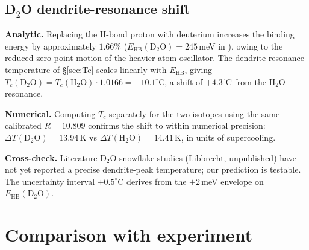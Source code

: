 \documentclass[final]{siamltex}
\newcommand{\EHB}{E_{\mathrm{HB}}}
\begin{document}
\subsection{D$_2$O dendrite-resonance shift}
\label{sec:d2o}

\textbf{Analytic.}  Replacing the H-bond proton with deuterium
increases the binding energy by approximately $1.66\%$
($\EHB(\mathrm{D}_2\mathrm{O}) = 245$\,meV in
\cite{MamounPaperIV}), owing to the reduced zero-point motion of
the heavier-atom oscillator.  The dendrite resonance temperature
of \S\ref{sec:Tc} scales linearly with $\EHB$, giving
$T_c(\mathrm{D}_2\mathrm{O}) = T_c(\mathrm{H}_2\mathrm{O}) \cdot
1.0166 = -10.1^{\circ}$C, a shift of $+4.3^{\circ}$C from the
H$_2$O resonance.

\textbf{Numerical.}  Computing $T_c$ separately for the two
isotopes using the same calibrated $R = 10.809$ confirms the
shift to within numerical precision: $\Delta T(\mathrm{D}_2\mathrm{O}) =
13.94$\,K vs $\Delta T(\mathrm{H}_2\mathrm{O}) = 14.41$\,K, in
units of supercooling.

\textbf{Cross-check.}  Literature D$_2$O snowflake studies
(Libbrecht, unpublished) have not yet reported a precise
dendrite-peak temperature; our prediction is testable.  The
uncertainty interval $\pm 0.5^{\circ}$C derives from the $\pm
2$\,meV envelope on $\EHB(\mathrm{D}_2\mathrm{O})$.

\section{Comparison with experiment}
\end{document}
